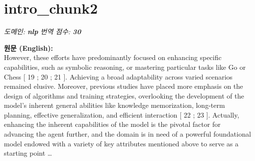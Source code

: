 \documentclass[12pt,a4paper]{article}
\begin{document}
\section{intro\_chunk2}
\noindent\textit{\small 도메인: \textbf{nlp} \quad 번역 점수: \textbf{\color{red!70!black}30}}
\vspace{0.5em}

\begin{mdframed}[style=orig]
\noindent\textbf{\small 원문 (English):}\\[2pt]
\small However, these efforts have predominantly focused on enhancing specific capabilities, such as symbolic reasoning, or mastering particular tasks like Go or Chess [ 19 ; 20 ; 21 ]. Achieving a broad adaptability across varied scenarios remained elusive. Moreover, previous studies have placed more emphasis on the design of algorithms and training strategies, overlooking the development of the model’s inherent general abilities like knowledge memorization, long-term planning, effective generalization, and efficient interaction [ 22 ; 23 ]. Actually, enhancing the inherent capabilities of the model is the pivotal factor for advancing the agent further, and the domain is in need of a powerful foundational model endowed with a variety of key attributes mentioned above to serve as a starting point \ldots
\end{mdframed}
\vspace{0.4em}
\end{document}
